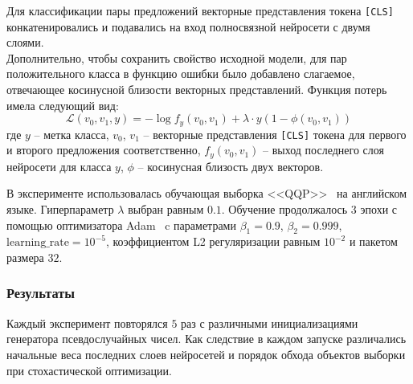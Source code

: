 \documentclass[a4paper,14pt]{extarticle}
\newcommand{\nocontentsline}[3]{}
\newcommand{\tocless}[2]{\bgroup\let\addcontentsline=\nocontentsline#1{#2}\egroup}
\begin{document}
    Для классификации пары предложений векторные представления токена \texttt{[CLS]} конкатенировались и подавались на вход полносвязной нейросети с двумя слоями.\\
    Дополнительно, чтобы сохранить свойство исходной модели, для пар положительного класса в функцию ошибки было добавлено слагаемое, отвечающее косинусной близости векторных представлений.
    Функция потерь имела следующий вид:
    \begin{equation}
    \mathcal{L}(v_0, v_1, y) = -\log{f_y{(v_0, v_1)}} + \lambda \cdot y\left( 1 - \phi{(v_0, v_1)} \right)
    \end{equation}
    где $y$ -- метка класса, $v_0$, $v_1$ -- векторные представления \texttt{[CLS]} токена для первого и второго предложения соответственно, $f_y{(v_0, v_1)}$ -- выход последнего слоя нейросети для класса $y$, $\phi$ -- косинусная близость двух векторов.
    
    В эксперименте использовалась обучающая выборка \mbox{<<QQP>>}~\autocite{iyer_csernai_dandekar_2017} на английском языке.
    Гиперпараметр $\lambda$ выбран равным $0.1$.
    Обучение продолжалось $3$ эпохи с помощью оптимизатора \mbox{Adam}~\autocite{kingma2014adam} c параметрами ${\beta_1 = 0.9}$, ${\beta_2 = 0.999}$, $\mathrm{learning\_rate} = {10}^{-5}$, коэффициентом {L2} регуляризации равным ${10}^{-2}$ и пакетом размера $32$.
 
\tocless\subsubsection{Результаты}
    Каждый эксперимент повторялся $5$ раз с различными инициализациями генератора псевдослучайных чисел.
    Как следствие в каждом запуске различались начальные веса последних слоев нейросетей и порядок обхода объектов выборки при стохастической оптимизации.
    
\end{document}
